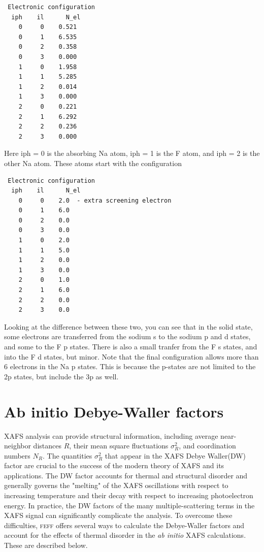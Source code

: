 \documentclass[11pt,oneside]{report} %
\newcommand{\program}[1]{\textsc{#1}}
\newcommand{\feff}{\program{feff}}
\begin{document}
\begin{verbatim}
 Electronic configuration
  iph    il      N_el
    0     0    0.521
    0     1    6.535
    0     2    0.358
    0     3    0.000
    1     0    1.958
    1     1    5.285
    1     2    0.014
    1     3    0.000
    2     0    0.221
    2     1    6.292
    2     2    0.236
    2     3    0.000
\end{verbatim}
Here iph = 0 is the absorbing Na atom, iph = 1 is the F atom, and iph = 2 is
the other Na atom. These atoms start with the configuration
\begin{verbatim}
 Electronic configuration
  iph    il      N_el
    0     0    2.0  - extra screening electron
    0     1    6.0
    0     2    0.0
    0     3    0.0
    1     0    2.0
    1     1    5.0
    1     2    0.0
    1     3    0.0
    2     0    1.0
    2     1    6.0
    2     2    0.0
    2     3    0.0
\end{verbatim}
Looking at the difference between these two, you can see that in the solid state, some electrons are transferred from the sodium s to the sodium p and d states, and some to the F p states. There is also a small tranfer from the F s states, and into the F d states, but minor. Note that the final configuration allows more than 6 electrons in the Na p states. This is because the p-states are not limited to the 2p states, but include the 3p as well.



\section{Ab initio Debye-Waller factors}
\label{sec:DWfactors}
XAFS analysis can provide structural information, including average near-neighbor distances $R$, their mean square fluctuations $\sigma_{R}^{2} $, and coordination numbers $N_R$.  The quantities $\sigma_{R}^{2} $ that appear in the XAFS Debye Waller(DW) factor are crucial to the success of the modern theory of XAFS and its applications.  The DW factor accounts for thermal and structural disorder and generally governs the "melting" of the XAFS oscillations with respect to increasing temperature and their decay with respect to increasing photoelectron energy.  In practice, the DW factors of the many multiple-scattering terms in the XAFS signal can significantly complicate the analysis.  To overcome these difficulties, {\feff} offers several ways to calculate the Debye-Waller factors and account for the effects of thermal disorder in the {\it ab initio} XAFS calculations.  These are described below.
\end{document}
